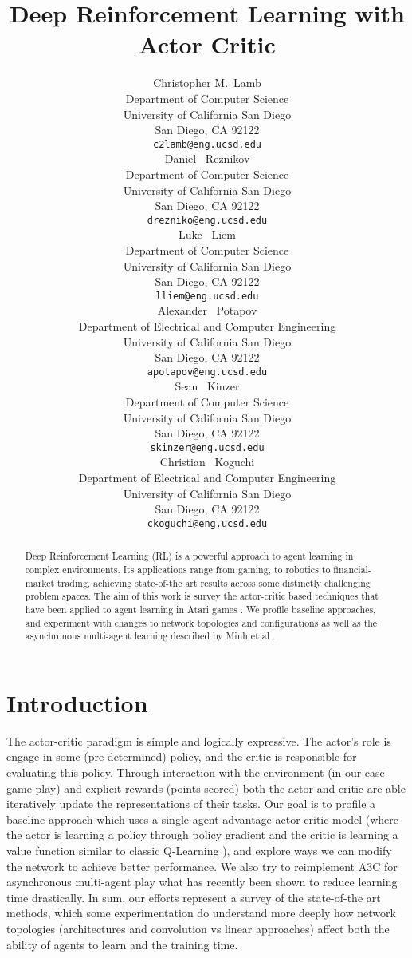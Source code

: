 \documentclass{article} %
\title{Deep Reinforcement Learning with Actor Critic}
\author{
Christopher M.~Lamb\\
Department of Computer Science\\
University of California San Diego\\
San Diego, CA 92122 \\
\texttt{c2lamb@eng.ucsd.edu} \\
\And
Daniel ~Reznikov\\
Department of Computer Science\\
University of California San Diego\\
San Diego, CA 92122 \\
\texttt{drezniko@eng.ucsd.edu} \\
\And
Luke ~Liem\\
Department of Computer Science\\
University of California San Diego\\
San Diego, CA 92122 \\
\texttt{lliem@eng.ucsd.edu} \\
\And
Alexander ~Potapov\\
Department of Electrical and Computer Engineering\\
University of California San Diego\\
San Diego, CA 92122 \\
\texttt{apotapov@eng.ucsd.edu} \\
\And
Sean ~Kinzer\\
Department of Computer Science\\
University of California San Diego\\
San Diego, CA 92122 \\
\texttt{skinzer@eng.ucsd.edu} \\
\And
Christian ~Koguchi\\
Department of Electrical and Computer Engineering\\
University of California San Diego\\
San Diego, CA 92122 \\
\texttt{ckoguchi@eng.ucsd.edu} \\
}
\begin{document}
\maketitle

\begin{abstract}
Deep Reinforcement Learning (RL) is a powerful approach to agent learning in complex environments. Its applications range from gaming, to robotics to financial-market trading, achieving state-of-the art results across some distinctly challenging problem spaces. The aim of this work is survey the actor-critic based techniques that have been applied to agent learning in Atari games \cite{aigym}. We profile baseline approaches, and experiment with changes to network topologies and configurations as well as the asynchronous multi-agent learning described by Minh et al \cite{a3c}.
\end{abstract}

\section{Introduction} 
The actor-critic paradigm is simple and logically expressive. The actor's role is engage in some (pre-determined) policy, and the critic is responsible for evaluating this policy. Through interaction with the environment (in our case game-play) and explicit rewards (points scored) both the actor and critic are able iteratively update the representations of their tasks. Our goal is to profile a baseline approach which uses a single-agent advantage actor-critic model (where the actor is learning a policy through policy gradient \cite{karpathy} and the critic is learning a value function similar to classic Q-Learning \cite{dqn}), and explore ways we can modify the network to achieve better performance. We also try to reimplement A3C \cite{a3c} for asynchronous multi-agent play what has recently been shown to reduce learning time drastically. In sum, our efforts represent a survey of the state-of-the art methods, which some experimentation do understand more deeply how network topologies (architectures and convolution vs linear approaches) affect both the ability of agents to learn and the training time.


\end{document}
